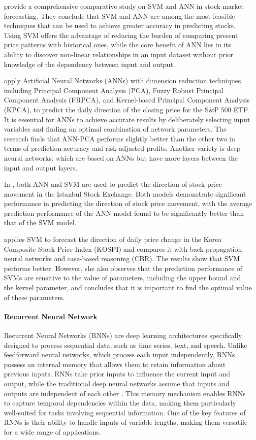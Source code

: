 \documentclass{article}
\begin{document}
\cite{kurani2023comprehensive} provide a comprehensive comparative study on SVM and ANN in stock market forecasting. They conclude that SVM and ANN are among the most feasible techniques that can be used to achieve greater accuracy in predicting stocks. Using SVM offers the advantage of reducing the burden of comparing present price patterns with historical ones, while the core benefit of ANN lies in its ability to discover non-linear relationships in an input dataset without prior knowledge of the dependency between input and output.

\cite{zhong2017forecasting} apply Artificial Neural Networks (ANNs) with dimension reduction techniques, including Principal Component Analysis (PCA), Fuzzy Robust Principal Component Analysis (FRPCA), and Kernel-based Principal Component Analysis (KPCA), to predict the daily direction of the closing price for the S\&P 500 ETF. It is essential for ANNs to achieve accurate results by deliberately selecting input variables and finding an optimal combination of network parameters. The research finds that ANN-PCA performs slightly better than the other two in terms of prediction accuracy and risk-adjusted profits. Another variety is deep neural networks, which are based on ANNs but have more layers between the input and output layers.

In \cite{kara2011predicting}, both ANN and SVM are used to predict the direction of stock price movement in the Istanbul Stock Exchange. Both models demonstrate significant performance in predicting the direction of stock price movement, with the average prediction performance of the ANN model found to be significantly better than that of the SVM model. 

\cite{kim2003financial} applies SVM to forecast the direction of daily price change in the Korea Composite Stock Price Index (KOSPI) and compares it with back-propagation neural networks and case-based reasoning (CBR). The results show that SVM performs better. However, she also observes that the prediction performance of SVMs are sensitive to the value of parameters, including the upper bound and the kernel parameter, and concludes that it is important to find the optimal value of these parameters.

\paragraph{Recurrent Neural Network}
Recurrent Neural Networks (RNNs) are deep learning architectures specifically designed to process sequential data, such as time series, text, and speech. Unlike feedforward neural networks, which process each input independently, RNNs possess an internal memory that allows them to retain information about previous inputs. RNNs take prior inputs to influence the current input and output, while the traditional deep neural networks assume that inputs and outputs are independent of each other \citep{elman1990finding}. This memory mechanism enables RNNs to capture temporal dependencies within the data, making them particularly well-suited for tasks involving sequential information. One of the key features of RNNs is their ability to handle inputs of variable lengths, making them versatile for a wide range of applications.
\end{document}

